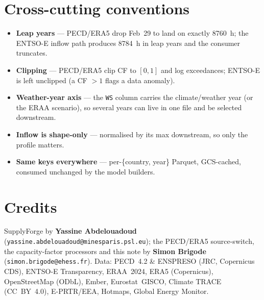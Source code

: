 \documentclass[11pt,a4paper]{article}
\begin{document}
\section{Cross-cutting conventions}
\begin{itemize}[nosep]
  \item \textbf{Leap years} --- PECD/ERA5 drop Feb~29 to land on exactly 8760~h; the ENTSO-E inflow path
        produces 8784~h in leap years and the consumer truncates.
  \item \textbf{Clipping} --- PECD/ERA5 clip CF to $[0,1]$ and log exceedances; ENTSO-E is left unclipped
        (a CF $>1$ flags a data anomaly).
  \item \textbf{Weather-year axis} --- the \texttt{WS} column carries the climate/weather year (or the
        ERAA scenario), so several years can live in one file and be selected downstream.
  \item \textbf{Inflow is shape-only} --- normalised by its max downstream, so only the profile matters.
  \item \textbf{Same keys everywhere} --- per-\{country, year\} Parquet, GCS-cached, consumed unchanged by
        the model builders.
\end{itemize}

\section*{Credits}
SupplyForge by \textbf{Yassine Abdelouadoud} (\texttt{yassine.abdelouadoud@minesparis.psl.eu}); the
PECD/ERA5 source-switch, the capacity-factor processors and this note by \textbf{Simon Brigode}
(\texttt{simon.brigode@ehess.fr}). Data: PECD~4.2 \& ENSPRESO (JRC, Copernicus CDS), ENTSO-E
Transparency, ERAA~2024, ERA5 (Copernicus), OpenStreetMap (ODbL), Ember, Eurostat~GISCO,
Climate TRACE (CC~BY~4.0), E-PRTR/EEA, Hotmaps, Global Energy Monitor.
\end{document}
